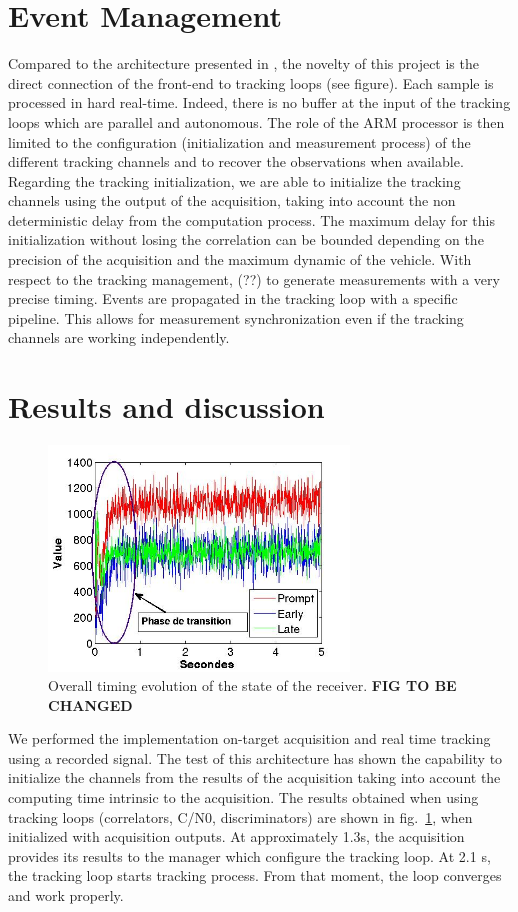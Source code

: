 \documentclass[conference]{IEEEtran}
\begin{document}
\section{Event Management}
Compared to the architecture presented in \cite{Maj18}, the novelty of this project is the direct connection of the front-end to tracking loops (see figure). Each sample is processed in hard real-time. Indeed, there is no buffer at the input of the tracking loops which are parallel and autonomous. The role of the ARM processor is then limited to the configuration (initialization and measurement process) of the different tracking channels and to recover the observations when available. Regarding the tracking initialization, we are able to initialize the tracking channels using the output of the acquisition, taking into account the non deterministic delay from the computation process. The maximum delay for this initialization without losing the correlation can be bounded depending on the precision of the acquisition and the maximum dynamic of the vehicle. With respect to the tracking management,  (??) to generate measurements with a very precise timing. Events are propagated in the tracking loop with a specific pipeline. This allows for measurement synchronization even if the tracking channels are working independently.


\section{Results and discussion}

 
\begin{figure}[!htbp]
\centerline{\includegraphics[width=8cm]{figs/Correlateurs.jpg}}
\caption{Overall timing evolution of the state of the receiver. \textbf{FIG TO BE CHANGED}}
\label{fig:Overalltiming}
\end{figure}
We performed the implementation on-target acquisition and real time tracking using a recorded signal. The test of this architecture has shown the capability to initialize the channels from the results of the acquisition taking into account the computing time intrinsic to the acquisition. The results obtained when using tracking loops (correlators, C/N0, discriminators) are shown in fig.~\ref{fig:Overalltiming}, when initialized with acquisition outputs. At approximately 1.3s, the acquisition provides its results to the manager which configure the tracking loop. At 2.1 s, the tracking loop starts tracking process. From that moment, the loop converges and work properly.
\end{document}
